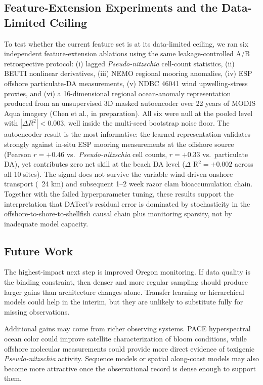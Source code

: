 \documentclass[toxins,article,submit,moreauthors]{Definitions/mdpi}
\begin{document}
\subsection{Feature-Extension Experiments and the Data-Limited Ceiling}
\label{sec:discussion-feature-extension}

To test whether the current feature set is at its data-limited ceiling, we ran six independent feature-extension ablations using the same leakage-controlled A/B retrospective protocol: (i) lagged \textit{Pseudo-nitzschia} cell-count statistics, (ii) BEUTI nonlinear derivatives, (iii) NEMO regional mooring anomalies, (iv) ESP offshore particulate-DA measurements, (v) NDBC 46041 wind upwelling-stress proxies, and (vi) a 16-dimensional regional ocean-anomaly representation produced from an unsupervised 3D masked autoencoder over 22 years of MODIS Aqua imagery (Chen et al., in preparation). All six were null at the pooled level with $|\Delta R^2| < 0.003$, well inside the multi-seed bootstrap noise floor. The autoencoder result is the most informative: the learned representation validates strongly against in-situ ESP mooring measurements at the offshore source (Pearson $r = +0.46$ vs.\ \textit{Pseudo-nitzschia} cell counts, $r = +0.33$ vs.\ particulate DA), yet contributes zero net skill at the beach DA level (\(\Delta\) R$^2 = +0.002$ across all 10 sites). The signal does not survive the variable wind-driven onshore transport (~24 km) and subsequent 1--2 week razor clam bioaccumulation chain. Together with the failed hyperparameter tuning, these results support the interpretation that DATect's residual error is dominated by stochasticity in the offshore-to-shore-to-shellfish causal chain plus monitoring sparsity, not by inadequate model capacity.

\subsection{Future Work}
\label{sec:discussion-future}

The highest-impact next step is improved Oregon monitoring. If data quality is the binding constraint, then denser and more regular sampling should produce larger gains than architecture changes alone. Transfer learning or hierarchical models could help in the interim, but they are unlikely to substitute fully for missing observations.

Additional gains may come from richer observing systems. PACE hyperspectral ocean color \cite{Werdell2019} could improve satellite characterization of bloom conditions, while offshore molecular measurements \cite{Brunson2024} could provide more direct evidence of toxigenic \textit{Pseudo-nitzschia} activity. Sequence models or spatial along-coast models may also become more attractive once the observational record is dense enough to support them.
\end{document}
